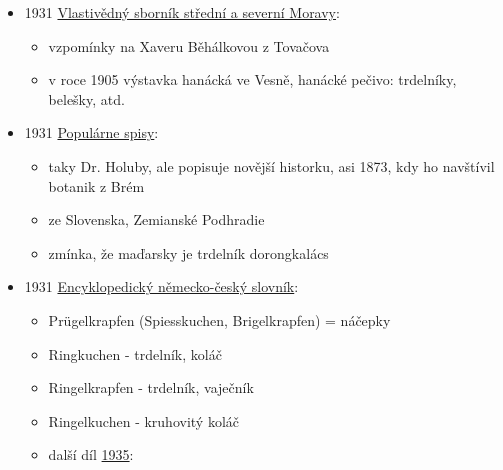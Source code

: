 \begin{itemize}
  \begin{itemize}
  \tightlist
  \item
    Která kuchařka to dnes uvaří? Dle vyprávování stařenek z Nákla
     (obec u Litovle) před 30 léty
  \item
    seznam různých starých jídel, u kterých autor nevěří, že je dneska
    některá kuchařka uvaří, aby se to dalo jíst
  \item
    15. Krupičková polívka a trdelníčky
  \end{itemize}
\item
  1931
  \href{https://www.digitalniknihovna.cz/vkol/uuid/uuid:c2c8f360-7588-407d-9bc7-d0c59adde597}{Vlastivědný
  sborník střední a severní Moravy}:

  \begin{itemize}
  \tightlist
  \item
    vzpomínky na Xaveru Běhálkovou z Tovačova
  \item
    v roce 1905 výstavka hanácká ve Vesně, hanácké pečivo: trdelníky,
    belešky, atd.
  \end{itemize}
\item
  1931
  \href{https://ndk.cz/view/uuid:dc35f5d0-c266-11ed-ac82-5ef3fc9bb22f?page=uuid\%3Acb35b596-b227-47df-bc08-358154471f54}{Populárne
  spisy}:

  \begin{itemize}
  \tightlist
  \item
    taky Dr. Holuby, ale popisuje novější historku, asi 1873, kdy ho
    navštívil botanik z Brém
  \item
    ze Slovenska, Zemianské Podhradie
  \item
    zmínka, že maďarsky je trdelník dorongkalács
  \end{itemize}
\item
  1931
  \href{https://ceskadigitalniknihovna.cz/uuid/uuid:918bbf20-d4ea-11e7-a047-005056825209}{Encyklopedický
  německo-český slovník}:

  \begin{itemize}
  \tightlist
  \item
    Prügelkrapfen (Spiesskuchen, Brigelkrapfen) = náčepky
  \item
    Ringkuchen - trdelník, koláč
  \item
    Ringelkrapfen - trdelník, vaječník
  \item
    Ringelkuchen - kruhovitý koláč
  \item
    další díl
    \href{https://ceskadigitalniknihovna.cz/uuid/uuid:83ae629b-8a1b-4b33-a2cb-0141786babd8}{1935}:


\end{itemize}
\end{itemize}
